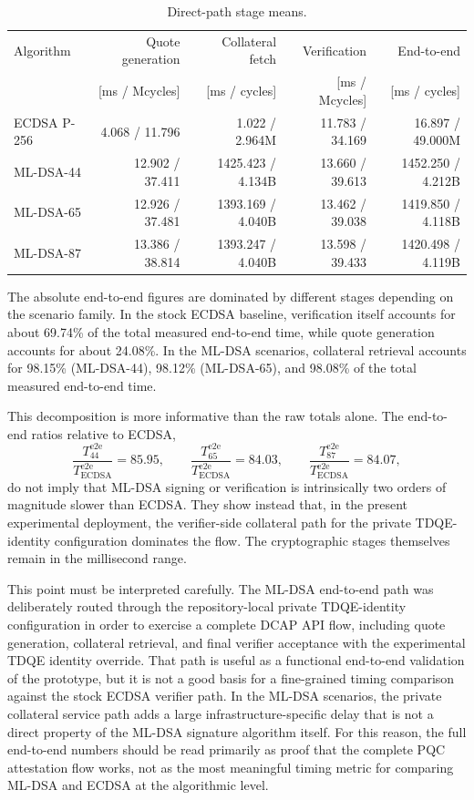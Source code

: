 \begin{table}[t]
\centering
\small
\caption{Direct-path stage means.}
\label{tab:direct-latency}
\begin{tabular}{|l|r|r|r|r|}
\hline
Algorithm & Quote generation & Collateral fetch & Verification & End-to-end \\
 & [ms / Mcycles] & [ms / cycles] & [ms / Mcycles] & [ms / cycles] \\
\hline
ECDSA P-256 & 4.068 / 11.796 & 1.022 / 2.964M & 11.783 / 34.169 & 16.897 / 49.000M \\
ML-DSA-44 & 12.902 / 37.411 & 1425.423 / 4.134B & 13.660 / 39.613 & 1452.250 / 4.212B \\
ML-DSA-65 & 12.926 / 37.481 & 1393.169 / 4.040B & 13.462 / 39.038 & 1419.850 / 4.118B \\
ML-DSA-87 & 13.386 / 38.814 & 1393.247 / 4.040B & 13.598 / 39.433 & 1420.498 / 4.119B \\
\hline
\end{tabular}
\end{table}

The absolute end-to-end figures are dominated by different stages depending on
the scenario family. In the stock ECDSA baseline, verification itself accounts
for about 69.74\% of the total measured end-to-end time, while quote
generation accounts for about 24.08\%. In the ML-DSA scenarios, collateral
retrieval accounts for 98.15\% (ML-DSA-44), 98.12\% (ML-DSA-65), and 98.08\%
of the total measured end-to-end time.

This decomposition is more informative than the raw totals alone. The end-to-end ratios relative to ECDSA,
\[
  \frac{T^{\mathrm{e2e}}_{44}}{T^{\mathrm{e2e}}_{\mathrm{ECDSA}}} = 85.95,
  \qquad
  \frac{T^{\mathrm{e2e}}_{65}}{T^{\mathrm{e2e}}_{\mathrm{ECDSA}}} = 84.03,
  \qquad
  \frac{T^{\mathrm{e2e}}_{87}}{T^{\mathrm{e2e}}_{\mathrm{ECDSA}}} = 84.07,
\]
do not imply that ML-DSA signing or verification is intrinsically two orders
of magnitude slower than ECDSA. They show instead that, in the present
experimental deployment, the verifier-side collateral path for the private
TDQE-identity configuration dominates the flow. The cryptographic stages
themselves remain in the millisecond range.

This point must be interpreted carefully. The ML-DSA end-to-end path was
deliberately routed through the repository-local private TDQE-identity
configuration in order to exercise a complete DCAP API flow, including quote
generation, collateral retrieval, and final verifier acceptance with the
experimental TDQE identity override. That path is useful as a functional
end-to-end validation of the prototype, but it is not a good basis for a
fine-grained timing comparison against the stock ECDSA verifier path. In the
ML-DSA scenarios, the private collateral service path adds a large
infrastructure-specific delay that is not a direct property of the ML-DSA
signature algorithm itself. For this reason, the full end-to-end numbers should
be read primarily as proof that the complete PQC attestation flow works, not as
the most meaningful timing metric for comparing ML-DSA and ECDSA at the
algorithmic level.

